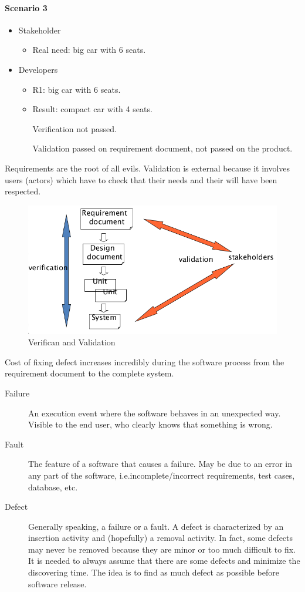 \paragraph{Scenario 3}
\begin{itemize}
\item Stakeholder
\begin{itemize}
\item Real need: big car with 6 seats.
\end{itemize}
\item Developers
\begin{itemize}
\item R1: big car with 6 seats.
\item Result: compact car with 4 seats.

Verification not passed.

Validation passed on requirement document, not passed on the product.
\end{itemize}
\end{itemize}

Requirements are the root of all evils. Validation is external because it involves users (actors) which have to check that their needs and their will have been respected.

\begin{figure}[hbtp]
\centering
\includegraphics[scale=0.4]{images/v_v.png}
\caption{Verifican and Validation}
\end{figure}

Cost of fixing defect increases incredibly during the software process from the requirement document to the complete system.

\begin{description}
\item [Failure] An execution event where the software behaves in an unexpected way. Visible to the end user, who clearly knows that something is wrong.
\item [Fault] The feature of a software that causes a failure. May be due to an error in any part of the software, i.e.\@ incomplete/incorrect requirements, test cases, database, etc.
\item [Defect] Generally speaking, a failure or a fault. A defect is characterized by an insertion activity and (hopefully) a removal activity. In fact, some defects may never be removed because they are minor or too much difficult to fix. It is needed to always assume that there are some defects and minimize the discovering time. The idea is to find as much defect as possible before software release.
\end{description}

